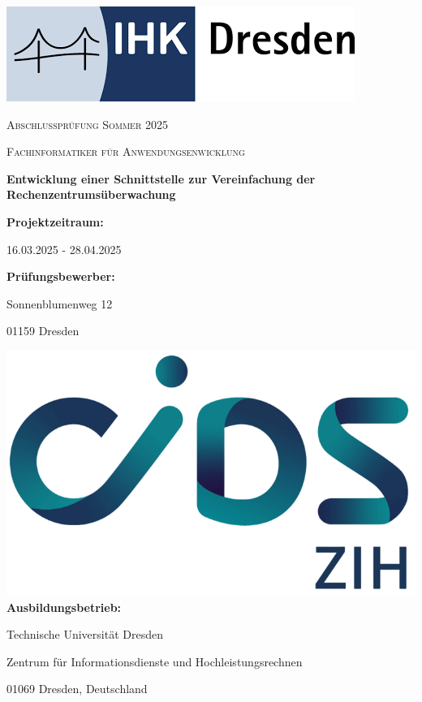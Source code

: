 \begin{titlepage}
	\centering
	\includegraphics[width=0.5\linewidth]{images/IHK_Logo.png}\par
	{\Large \textsc{Abschlussprüfung Sommer 2025}\par}
	\vspace{1cm}
	{\Large \textsc{Fachinformatiker für Anwendungsenwicklung}\par}
	\vspace{1.5cm}
	{\huge\bfseries Entwicklung einer Schnittstelle zur Vereinfachung der Rechenzentrumsüberwachung \par}
	\vspace{2cm}
	\textbf{Projektzeitraum:}\par
	16.03.2025 - 28.04.2025\par
	\vfill
	\textbf{Prüfungsbewerber:}\par
	\text{\autorName}\par
	Sonnenblumenweg 12\par 01159 Dresden
	
	\vfill
	\includegraphics[width=0.5\linewidth]{images/ZIH_Logo_Abk_RGB.png}
	\vfill
	\textbf{Ausbildungsbetrieb:}\par
	Technische Universität Dresden\par
	Zentrum für Informationsdienste und Hochleistungsrechnen\par
	01069 Dresden, Deutschland\par
\end{titlepage}